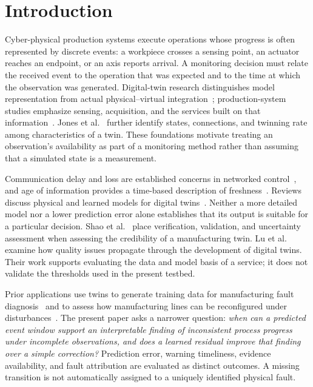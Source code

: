 \section{Introduction}
Cyber-physical production systems execute operations whose progress is often represented by discrete events: a workpiece crosses a sensing point, an actuator reaches an endpoint, or an axis reports arrival. A monitoring decision must relate the received event to the operation that was expected and to the time at which the observation was generated. Digital-twin research distinguishes model representation from actual physical--virtual integration~\cite{Kritzinger2018}; production-system studies emphasize sensing, acquisition, and the services built on that information~\cite{Negri2017,Uhlemann2017,Cimino2019}. Jones et al.~\cite{Jones2020} further identify states, connections, and twinning rate among characteristics of a twin. These foundations motivate treating an observation's availability as part of a monitoring method rather than assuming that a simulated state is a measurement.

Communication delay and loss are established concerns in networked control~\cite{Hespanha2007}, and age of information provides a time-based description of freshness~\cite{Yates2021}. Reviews discuss physical and learned models for digital twins~\cite{Rasheed2020,Fuller2020}. Neither a more detailed model nor a lower prediction error alone establishes that its output is suitable for a particular decision. Shao et al.~\cite{Shao2023} place verification, validation, and uncertainty assessment when assessing the credibility of a manufacturing twin. Lu et al.~\cite{Lu2024} examine how quality issues propagate through the development of digital twins. Their work supports evaluating the data and model basis of a service; it does not validate the thresholds used in the present testbed.

Prior applications use twins to generate training data for manufacturing fault diagnosis~\cite{Ademujimi2022} and to assess how manufacturing lines can be reconfigured under disturbances~\cite{Fu2025}. The present paper asks a narrower question: \emph{when can a predicted event window support an interpretable finding of inconsistent process progress under incomplete observations, and does a learned residual improve that finding over a simple correction?} Prediction error, warning timeliness, evidence availability, and fault attribution are evaluated as distinct outcomes. A missing transition is not automatically assigned to a uniquely identified physical fault.

